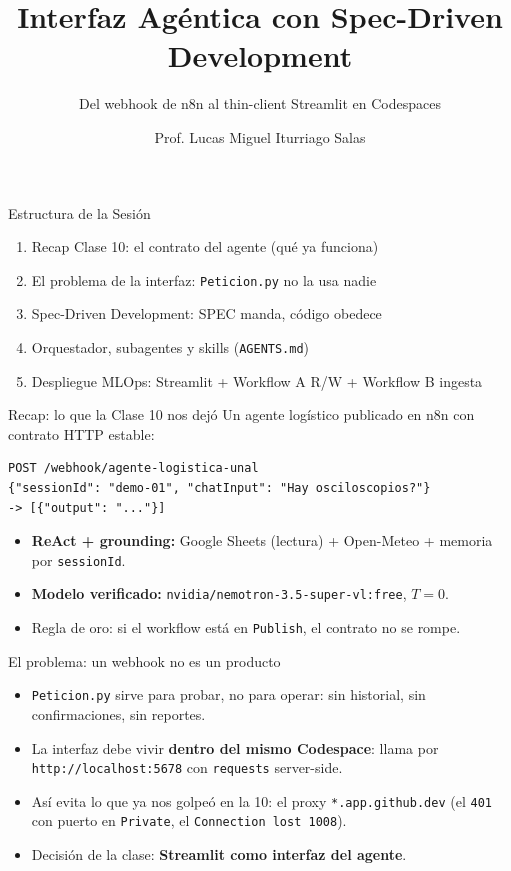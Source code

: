 \documentclass[aspectratio=169,11pt]{beamer}
\title{Interfaz Agéntica con Spec-Driven Development}
\subtitle{Del webhook de n8n al thin-client Streamlit en Codespaces}
\author{Prof. Lucas Miguel Iturriago Salas}
\institute[UNAL]{Universidad Nacional de Colombia \\ Dept. Ing. Eléctrica, Electrónica y Computación \\ Primer Semestre -- 2026}
\date{}
\begin{document}
\begin{frame}
  \titlepage
\end{frame}

\begin{frame}{Estructura de la Sesión}
  \begin{enumerate}
    \item Recap Clase 10: el contrato del agente (qué ya funciona)
    \item El problema de la interfaz: \texttt{Peticion.py} no la usa nadie
    \item Spec-Driven Development: SPEC manda, código obedece
    \item Orquestador, subagentes y skills (\texttt{AGENTS.md})
    \item Despliegue MLOps: Streamlit + Workflow A R/W + Workflow B ingesta
  \end{enumerate}
\end{frame}

\begin{frame}[fragile]{Recap: lo que la Clase 10 nos dejó}
  Un agente logístico publicado en n8n con contrato HTTP estable:
\begin{lstlisting}
POST /webhook/agente-logistica-unal
{"sessionId": "demo-01", "chatInput": "Hay osciloscopios?"}
-> [{"output": "..."}]
\end{lstlisting}
  \begin{itemize}
    \item \textbf{ReAct + grounding:} Google Sheets (lectura) + Open-Meteo + memoria por \texttt{sessionId}.
    \item \textbf{Modelo verificado:} \texttt{nvidia/nemotron-3.5-super-vl:free}, $T=0$.
    \item Regla de oro: si el workflow está en \texttt{Publish}, el contrato no se rompe.
  \end{itemize}
\end{frame}

\begin{frame}{El problema: un webhook no es un producto}
  \begin{itemize}
    \item \texttt{Peticion.py} sirve para probar, no para operar: sin historial, sin confirmaciones, sin reportes.
    \item La interfaz debe vivir \textbf{dentro del mismo Codespace}: llama por \texttt{http://localhost:5678} con \texttt{requests} server-side.
    \item Así evita lo que ya nos golpeó en la 10: el proxy \texttt{*.app.github.dev} (el \texttt{401} con puerto en \texttt{Private}, el \texttt{Connection lost 1008}).
    \item Decisión de la clase: \textbf{Streamlit como interfaz del agente}.
  \end{itemize}
\end{frame}
\end{document}
